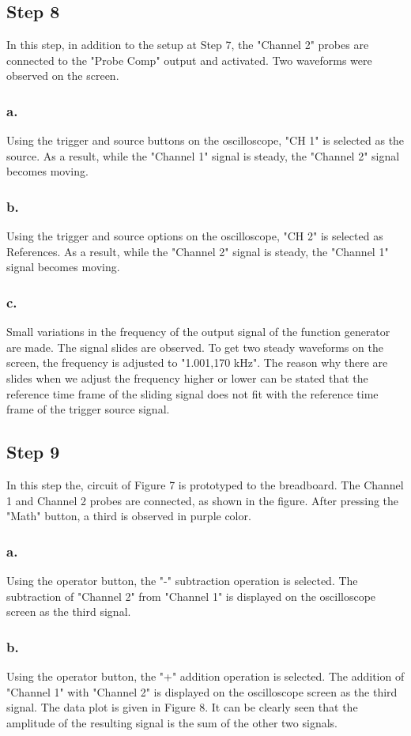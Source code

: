 \documentclass[letterpaper,12pt]{article}
\begin{document}
\subsection{Step 8}
In this step, in addition to the setup at Step 7, the "Channel 2" probes are connected to the "Probe Comp" output and activated. Two waveforms were observed on the screen.
\subsubsection{a.}
Using the trigger and source buttons on the oscilloscope, "CH 1" is selected as the source. As a result, while the "Channel 1" signal is steady, the "Channel 2" signal becomes moving. 
\subsubsection{b.}
Using the trigger and source options on the oscilloscope, "CH 2" is selected as References. As a result, while the "Channel 2" signal is steady, the "Channel 1" signal becomes moving. 
\subsubsection{c.}
Small variations in the frequency of the output signal of the function generator are made. The signal slides are observed. To get two steady waveforms on the screen, the frequency is adjusted to "1.001,170 kHz". The reason why there are slides when we adjust the frequency higher or lower can be stated that the reference time frame of the sliding signal does not fit with the reference time frame of the trigger source signal.

\subsection{Step 9}
In this step the, circuit of Figure  7 is prototyped to the breadboard. The Channel 1 and Channel 2 probes are connected, as shown in the figure. After pressing the "Math" button, a third is observed in purple color. 


\subsubsection{a.}
Using the operator button, the "-" subtraction operation is selected. The subtraction of "Channel 2" from "Channel 1" is displayed on the oscilloscope screen as the third signal. 
\subsubsection{b.}
Using the operator button, the "+" addition operation is selected. The addition of "Channel 1" with "Channel 2" is displayed on the oscilloscope screen as the third signal. The data plot is given in Figure 8. It can be clearly seen that the amplitude of the resulting signal is the sum of the other two signals. 
\end{document}
